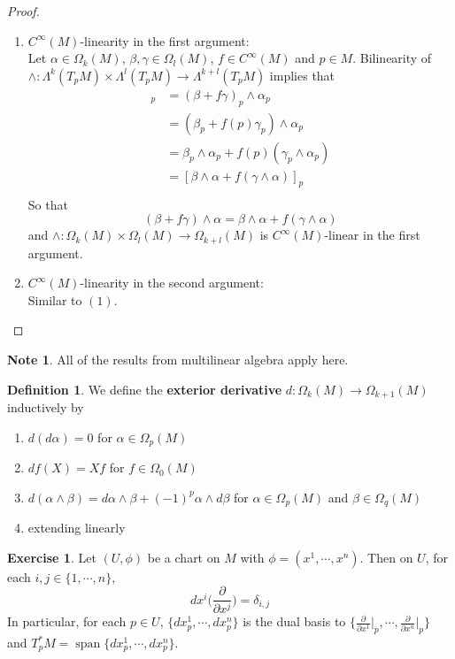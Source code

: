 \documentclass{book}
\theoremstyle{definition}
\newtheorem{defn}[definition]{Definition}
\newtheorem{note}[definition]{Note}
\newtheorem{ex}[definition]{Exercise}
\newcommand{\al}{\alpha}
\newcommand{\be}{\beta}
\newcommand{\gam}{\gamma}
\newcommand{\del}{\delta}
\newcommand{\Lam}{\Lambda}
\newcommand{\Om}{\Omega}
\DeclareMathOperator{\spn}{span}
\DeclareMathOperator*{\0}{\mbf{0}}
\DeclareMathOperator*{\1}{\mbf{1}}
\newcommand{\p}{\partial}
\begin{document}
	\begin{proof}\
	\begin{enumerate}
	\item 
	$C^{\infty}(M)$-linearity in the first argument:\\
	Let $\al \in \Om_k(M)$, $\be, \gam \in \Om_l(M)$, $f \in C^{\infty}(M)$ and $p \in M$. Bilinearity of $\wedge: \Lam^k(T_pM) \times \Lam^l(T_pM) \rightarrow \Lam^{k+l}(T_pM)$ implies that
	\begin{align*}
	[(\be + f \gam ) \wedge \al]_p 
	&= (\be + f \gam)_p \wedge \al_p  \\
	&=(\be_p + f(p) \gam_p) \wedge \al_p \\
	&= \be_p \wedge \al_p + f(p)( \gam_p \wedge \al_p) \\
	&=  [\be \wedge \al + f (\gam \wedge \al)]_p \\
	\end{align*}
	So that $$(\be + f \gam ) \wedge \al = \be \wedge \al  + f  (\gam \wedge \al)$$ and $\wedge: \Om_k(M) \times \Om_l(M) \rightarrow \Om_{k+l}(M) $ is $C^{\infty}(M)$-linear in the first argument. 
	\item $C^{\infty}(M)$-linearity in the second argument:\\
	Similar to $(1)$.
	\end{enumerate}
	\end{proof}
	
	\begin{note}
		All of the results from multilinear algebra apply here.
	\end{note}

	\begin{defn}
		We define the \textbf{exterior derivative} $d: \Om_k(M) \rightarrow \Om_{k+1}(M)$ inductively by 
		\begin{enumerate}
			\item $d(d \al) = 0$ for $\al \in \Om_p(M)$
			\item $df(X) = Xf$ for $f \in \Om_0(M)$
			\item $d(\al \wedge \be) = d\al \wedge \be + (-1)^p \al \wedge d\be$ for $\al \in \Om_p(M)$ and $\be \in \Om_q(M)$
			\item extending linearly
		\end{enumerate}
	\end{defn}

	\begin{ex}
		Let $(U, \phi)$ be a chart on $M$ with $\phi = (x^1, \cdots, x^n)$. Then on $U$, for each $i,j \in \{1, \cdots, n\}$, $$dx^i\bigg(\frac{\p}{\p x^j} \bigg) = \del_{i,j}$$ 
		In particular, for each $p \in U$, $\{dx^1_p, \cdots, dx^n_p \}$ is the dual basis to $\bigg \{ \frac{\p}{\p x^1} \bigg|_p, \cdots, \frac{\p}{\p x^n} \bigg|_p \bigg \}$ and $T_p^*M = \spn\{dx^1_p, \cdots, dx^n_p\}$.
	\end{ex}
\end{document}
